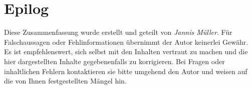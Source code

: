 \documentclass[12pt,a4paper]{article}
\begin{document}
\section{Epilog}
\noindent
Diese Zusammenfassung wurde erstellt und geteilt von \textit{Jannis Müller}. Für Falschaussagen oder Fehlinformationen übernimmt der Autor keinerlei Gewähr. Es ist empfehlenswert, sich selbst mit den Inhalten vertraut zu machen und die hier dargestellten Inhalte gegebenenfalls zu korrigieren. Bei Fragen oder inhaltlichen Fehlern kontaktieren sie bitte umgehend den Autor und weisen auf die von Ihnen festgestellten Mängel hin. 
\end{document}
